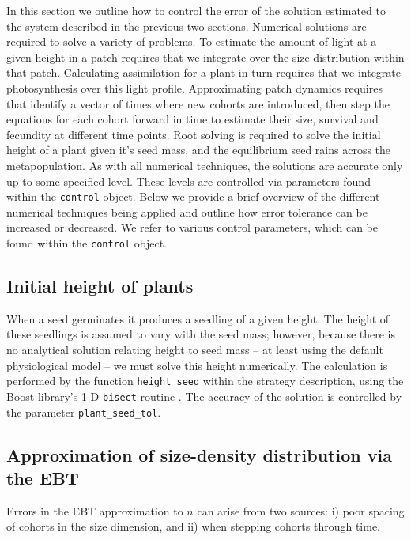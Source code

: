 \documentclass[10pt,twoside]{article}
\begin{document}
In this section we outline how to control the error of the solution
estimated to the system described in the previous two sections.
Numerical solutions are required to solve a variety of problems. To
estimate the amount of light at a given height in a patch requires that
we integrate over the size-distribution within that patch. Calculating
assimilation for a plant in turn requires that we integrate
photosynthesis over this light profile. Approximating patch dynamics
requires that identify a vector of times where new cohorts are
introduced, then step the equations for each cohort forward in time to
estimate their size, survival and fecundity at different time points.
Root solving is required to solve the initial height of a plant given
it's seed mass, and the equilibrium seed rains across the
metapopulation. As with all numerical techniques, the solutions are
accurate only up to some specified level. These levels are controlled
via parameters found within the \texttt{control} object. Below we
provide a brief overview of the different numerical techniques being
applied and outline how error tolerance can be increased or decreased. 
We refer to various control parameters, which can be found within the 
\texttt{control} object. 

\subsection{Initial height of plants}\label{initial-height-of-plants}

When a seed germinates it produces a seedling of a given height. The
height of these seedlings is assumed to vary with the seed mass;
however, because there is no analytical solution relating height to seed
mass -- at least using the default physiological model -- we must solve
this height numerically. The calculation is performed by the function
\texttt{height\_seed} within the strategy description, using the Boost
library's 1-D \texttt{bisect} routine
\citep{Schaling-2014, Eddelbuettel-2015}. The accuracy of the solution
is controlled by the parameter \texttt{plant\_seed\_tol}.

\subsection{Approximation of size-density distribution via the
EBT}\label{approximation-of-size-density-distribution-via-the-ebt}

Errors in the EBT approximation to \(n\) can arise from two sources: i)
poor spacing of cohorts in the size dimension, and ii) when stepping
cohorts through time.
\end{document}
